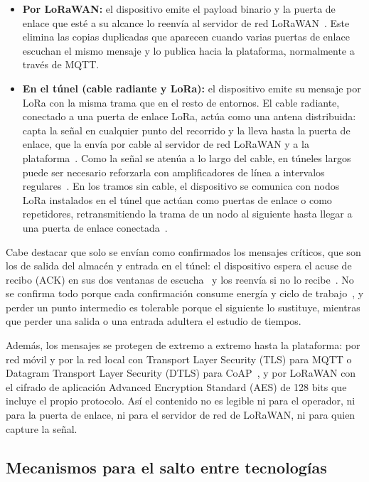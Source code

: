 \documentclass[11pt,a4paper]{article}
\begin{document}
\begin{itemize}
\begin{itemize}
        \item \textbf{Por LoRaWAN:} el dispositivo emite el payload binario y la puerta de enlace que esté a su alcance lo reenvía al servidor de red LoRaWAN~\cite{ref24}. Este elimina las copias duplicadas que aparecen cuando varias puertas de enlace escuchan el mismo mensaje y lo publica hacia la plataforma, normalmente a través de MQTT.

        \item \textbf{En el túnel (cable radiante y LoRa):} el dispositivo emite su mensaje por LoRa con la misma trama que en el resto de entornos. El cable radiante, conectado a una puerta de enlace LoRa, actúa como una antena distribuida: capta la señal en cualquier punto del recorrido y la lleva hasta la puerta de enlace, que la envía por cable al servidor de red LoRaWAN y a la plataforma~\cite{ref31}. Como la señal se atenúa a lo largo del cable, en túneles largos puede ser necesario reforzarla con amplificadores de línea a intervalos regulares~\cite{ref32}. En los tramos sin cable, el dispositivo se comunica con nodos LoRa instalados en el túnel que actúan como puertas de enlace o como repetidores, retransmitiendo la trama de un nodo al siguiente hasta llegar a una puerta de enlace conectada~\cite{ref33}.
    \end{itemize}
\end{itemize}

Cabe destacar que solo se envían como confirmados los mensajes críticos, que son los de salida del almacén y entrada en el túnel: el dispositivo espera el acuse de recibo (ACK) en sus dos ventanas de escucha~\cite{ref34} y los reenvía si no lo recibe~\cite{ref35}. No se confirma todo porque cada confirmación consume energía y ciclo de trabajo~\cite{ref34}, y perder un punto intermedio es tolerable porque el siguiente lo sustituye, mientras que perder una salida o una entrada adultera el estudio de tiempos.

Además, los mensajes se protegen de extremo a extremo hasta la plataforma: por red móvil y por la red local con Transport Layer Security (TLS) para MQTT o Datagram Transport Layer Security (DTLS) para CoAP~\cite{ref29,ref30}, y por LoRaWAN con el cifrado de aplicación Advanced Encryption Standard (AES) de 128 bits que incluye el propio protocolo. Así el contenido no es legible ni para el operador, ni para la puerta de enlace, ni para el servidor de red de LoRaWAN, ni para quien capture la señal.

\subsection{Mecanismos para el salto entre tecnologías}
\label{sec:apartado5_2}
\end{document}
